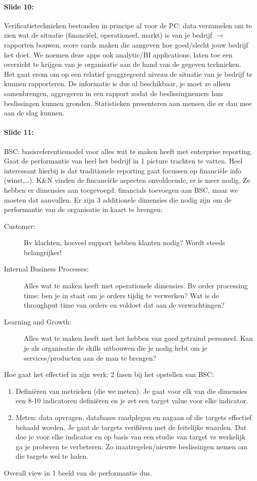 \documentclass[10pt,a4paper]{report}
\begin{document}
\paragraph{Slide 10:}Verificatietechnieken bestonden in principe al voor de PC: data verzamelen om te zien wat de situatie (financi\"eel, operationeel, markt) is van je bedrijf $\rightarrow$ rapporten bouwen, score cards maken die aangeven hoe goed/slecht jouw bedrijf het doet. We noemen deze apps ook analytic/BI applications: laten toe een overzicht te krijgen van je organisatie aan de hand van de gegeven technieken. Het gaat erom om op een relatief geaggregeerd niveau de situatie van je bedrijf te kunnen rapporteren. De informatie is dus al beschikbaar, je moet ze alleen samenbrengen, aggregeren in een rapport zodat de beslissingnemers hun beslissingen kunnen gronden. Statistieken presenteren aan mensen die er dan mee aan de slag kunnen.

\paragraph{Slide 11:}BSC: basisreferentiemodel voor alles wat te maken heeft met enterprise reporting. Gaat de performantie van heel het bedrijf in 1 picture trachten te vatten. Heel interessant hierbij is dat traditionele reporting gaat focussen op financiële info (winst,…). K\&N vinden de fincanciële aspecten onvoldoende, er is meer nodig. Ze hebben er dimensies aan toegevoegd: financials toevoegen aan BSC, maar we moeten dat aanvullen. Er zijn 3 additionele dimensies die nodig zijn om de performantie van de organisatie in kaart te brengen:
\begin{description}
\item[Customer:]Bv klachten, hoeveel support hebben klanten nodig? Wordt steeds belangrijker!
\item[Internal Business Processes:]Alles wat te maken heeft met operationele dimensies. Bv order processing time: ben je in staat om je orders tijdig te verwerken? Wat is de throughput time van orders en voldoet dat aan de verwachtingen? 
\item[Learning and Growth:]Alles wat te maken heeft met het hebben van goed getraind personeel. Kan je als organisatie de skills uitbouwen die je nodig hebt om je services/producten aan de man te brengen?
\end{description}
Hoe gaat het effectief in zijn werk: 2 fasen bij het opstellen van BSC: 
\begin{enumerate}
\item Definiëren van metrieken (die we meten). Je gaat voor elk van die dimensies een 8-10 indicatoren definiëren en je zet een target value voor elke indicator.
\item Meten: data opvragen, databases raadplegen en nagaan of die targets effectief behaald worden. Je gaat de targets verifiëren met de feitelijke waarden. Dat doe je voor elke indicator en op basis van een studie van target vs werkelijk ga je proberen te verbeteren. Zo maatregelen/nieuwe beslissingen nemen om die targets wel te halen.
\end{enumerate}
Overall view in 1 beeld van de performantie dus.
\end{document}
